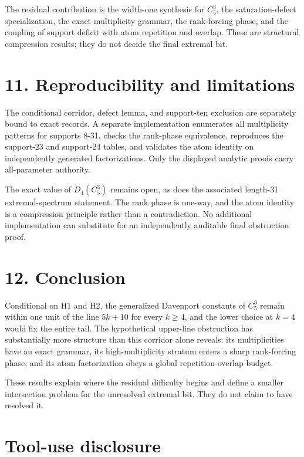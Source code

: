 \documentclass[
  11pt,
]{article}
\begin{document}
The residual contribution is the width-one synthesis for \(C_5^3\), the
saturation-defect specialization, the exact multiplicity grammar, the
rank-forcing phase, and the coupling of support deficit with atom
repetition and overlap. These are structural compression results; they
do not decide the final extremal bit.

\hypertarget{reproducibility-and-limitations}{%
\section{11. Reproducibility and
limitations}\label{reproducibility-and-limitations}}

The conditional corridor, defect lemma, and support-ten exclusion are
separately bound to exact records. A separate implementation enumerates
all multiplicity patterns for supports 8-31, checks the rank-phase
equivalence, reproduces the support-23 and support-24 tables, and
validates the atom identity on independently generated factorizations.
Only the displayed analytic proofs carry all-parameter authority.

The exact value of \(D_4(C_5^3)\) remains open, as does the associated
length-31 extremal-spectrum statement. The rank phase is one-way, and
the atom identity is a compression principle rather than a
contradiction. No additional implementation can substitute for an
independently auditable final obstruction proof.

\hypertarget{conclusion}{%
\section{12. Conclusion}\label{conclusion}}

Conditional on H1 and H2, the generalized Davenport constants of
\(C_5^3\) remain within one unit of the line \(5k+10\) for every
\(k\ge4\), and the lower choice at \(k=4\) would fix the entire tail.
The hypothetical upper-line obstruction has substantially more structure
than this corridor alone reveals: its multiplicities have an exact
grammar, its high-multiplicity stratum enters a sharp rank-forcing
phase, and its atom factorization obeys a global repetition-overlap
budget.

These results explain where the residual difficulty begins and define a
smaller intersection problem for the unresolved extremal bit. They do
not claim to have resolved it.

\hypertarget{tool-use-disclosure}{%
\section{Tool-use disclosure}\label{tool-use-disclosure}}
\end{document}
